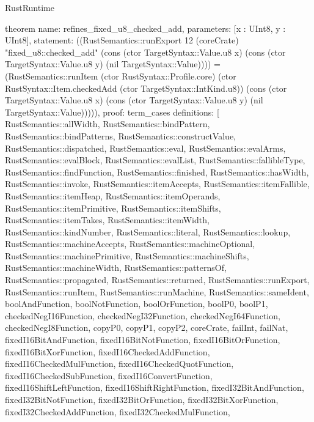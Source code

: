 \begin{lexlean}{RustRuntime}
\begin{semanticmodule}
theorem{
  name: refines_fixed_u8_checked_add,
  parameters: [x : UInt8, y : UInt8],
  statement: ((RustSemantics::runExport 12 (coreCrate) "fixed_u8::checked_add" (cons (ctor TargetSyntax::Value.u8 x) (cons (ctor TargetSyntax::Value.u8 y) (nil TargetSyntax::Value)))) = (RustSemantics::runItem (ctor RustSyntax::Profile.core) (ctor RustSyntax::Item.checkedAdd (ctor TargetSyntax::IntKind.u8)) (cons (ctor TargetSyntax::Value.u8 x) (cons (ctor TargetSyntax::Value.u8 y) (nil TargetSyntax::Value))))),
  proof: term_cases{
    definitions: [
      RustSemantics::allWidth,
      RustSemantics::bindPattern,
      RustSemantics::bindPatterns,
      RustSemantics::constructValue,
      RustSemantics::dispatched,
      RustSemantics::eval,
      RustSemantics::evalArms,
      RustSemantics::evalBlock,
      RustSemantics::evalList,
      RustSemantics::fallibleType,
      RustSemantics::findFunction,
      RustSemantics::finished,
      RustSemantics::hasWidth,
      RustSemantics::invoke,
      RustSemantics::itemAccepts,
      RustSemantics::itemFallible,
      RustSemantics::itemHeap,
      RustSemantics::itemOperands,
      RustSemantics::itemPrimitive,
      RustSemantics::itemShifts,
      RustSemantics::itemTakes,
      RustSemantics::itemWidth,
      RustSemantics::kindNumber,
      RustSemantics::literal,
      RustSemantics::lookup,
      RustSemantics::machineAccepts,
      RustSemantics::machineOptional,
      RustSemantics::machinePrimitive,
      RustSemantics::machineShifts,
      RustSemantics::machineWidth,
      RustSemantics::patternsOf,
      RustSemantics::propagated,
      RustSemantics::returned,
      RustSemantics::runExport,
      RustSemantics::runItem,
      RustSemantics::runMachine,
      RustSemantics::sameIdent,
      boolAndFunction,
      boolNotFunction,
      boolOrFunction,
      boolP0,
      boolP1,
      checkedNegI16Function,
      checkedNegI32Function,
      checkedNegI64Function,
      checkedNegI8Function,
      copyP0,
      copyP1,
      copyP2,
      coreCrate,
      failInt,
      failNat,
      fixedI16BitAndFunction,
      fixedI16BitNotFunction,
      fixedI16BitOrFunction,
      fixedI16BitXorFunction,
      fixedI16CheckedAddFunction,
      fixedI16CheckedMulFunction,
      fixedI16CheckedQuotFunction,
      fixedI16CheckedSubFunction,
      fixedI16ConvertFunction,
      fixedI16ShiftLeftFunction,
      fixedI16ShiftRightFunction,
      fixedI32BitAndFunction,
      fixedI32BitNotFunction,
      fixedI32BitOrFunction,
      fixedI32BitXorFunction,
      fixedI32CheckedAddFunction,
      fixedI32CheckedMulFunction,
}}
\end{semanticmodule}
\end{lexlean}
